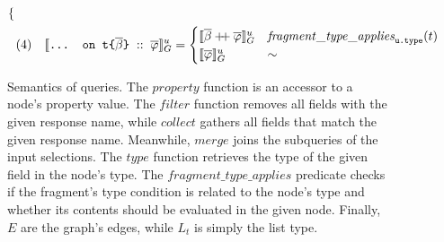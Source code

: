 \begin{figure}[t]
\begin{align*}
\begin{cases}
    \end{cases}\\
    & (4) & \llbracket \texttt{... on t}\texttt{\{}\overline{\beta}\texttt{\}}\; ::\; \overline{\varphi} \rrbracket^{u}_{G} &= \begin{cases}
    \llbracket \overline{\beta} \mathbin{+\mkern-5mu+} \overline{\varphi} \rrbracket^{u}_{G} & \mathit{fragment\_type\_applies}_{\texttt{u.type}}(t)\\
    \llbracket \overline{\varphi} \rrbracket^{u}_{G} & \sim
    \end{cases}
    \end{align*}
    \caption{Semantics of \gql queries. The $\mathit{property}$ function is an accessor to a node's property value. The $\mathit{filter}$ function removes all fields with the given response name, while $\mathit{collect}$ gathers all fields that match the given response name. 
    Meanwhile, $\mathit{merge}$ joins the subqueries of the input selections. The $\mathit{type}$ function retrieves the type of the given field in the node's type.
	The $\mathit{fragment\_type\_applies}$ predicate checks if the fragment's type condition is related to the node's type and whether its contents should be evaluated in the given node.
	Finally, $E$ are the graph's edges, while $L_{t}$ is simply the list type.
    }
    \label{fig:semantics}
\end{figure}



